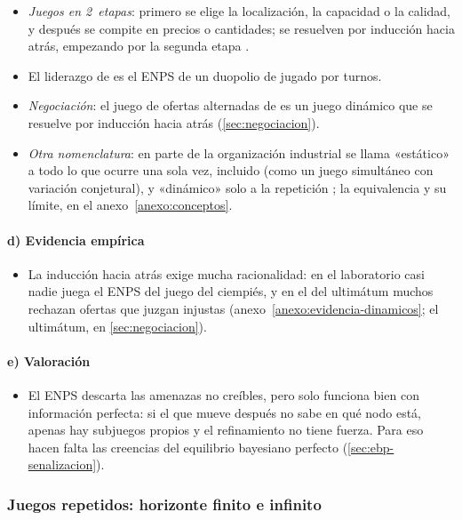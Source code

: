 \documentclass[11pt]{article}
\begin{document}
\begin{itemize}
\item \emph{Juegos en 2~etapas}: primero se elige la localización, la capacidad o la calidad, y después se compite en precios o cantidades; se resuelven por inducción hacia atrás, empezando por la segunda etapa  .
\item El liderazgo de  es el ENPS de un duopolio de  jugado por turnos.
\item \emph{Negociación}: el juego de ofertas alternadas de  es un juego dinámico que se resuelve por inducción hacia atrás (\ref{sec:negociacion}).
\item \emph{Otra nomenclatura}: en parte de la organización industrial se llama «estático» a todo lo que ocurre una sola vez,  incluido (como un juego simultáneo con variación conjetural), y «dinámico» solo a la repetición ; la equivalencia y su límite, en el anexo~\ref{anexo:conceptos}.
\end{itemize}

\paragraph{d) Evidencia empírica}

\begin{itemize}
\item La inducción hacia atrás exige mucha racionalidad: en el laboratorio casi nadie juega el ENPS del juego del ciempiés, y en el del ultimátum muchos rechazan ofertas que juzgan injustas (anexo~\ref{anexo:evidencia-dinamicos}; el ultimátum, en \ref{sec:negociacion}).
\end{itemize}

\paragraph{e) Valoración}

\begin{itemize}
\item El ENPS descarta las amenazas no creíbles, pero solo funciona bien con información perfecta: si el que mueve después no sabe en qué nodo está, apenas hay subjuegos propios y el refinamiento no tiene fuerza. Para eso hacen falta las creencias del equilibrio bayesiano perfecto (\ref{sec:ebp-senalizacion}).
\end{itemize}

\subsubsection{Juegos repetidos: horizonte finito e infinito}\label{sec:repetidos}
\end{document}
